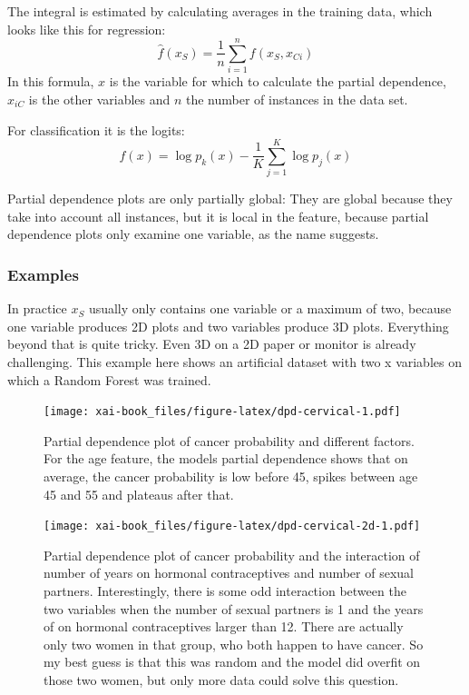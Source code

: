 \documentclass[12pt,]{krantz}
\theoremstyle{definition}
\theoremstyle{definition}
\theoremstyle{definition}
\theoremstyle{remark}
\begin{document}
The integral is estimated by calculating averages in the training data,
which looks like this for regression:
\[ \hat{f}(x_S) = \frac{1}{n} \sum_{i=1}^n f(x_S, x_{Ci}) \] In this
formula, \(x\) is the variable for which to calculate the partial
dependence, \(x_{iC}\) is the other variables and \(n\) the number of
instances in the data set.

For classification it is the logits:
\[ f(x) = \log p_k(x) - \frac{1}{K} \sum_{j=1}^K \log p_j(x) \]

Partial dependence plots are only partially global: They are global
because they take into account all instances, but it is local in the
feature, because partial dependence plots only examine one variable, as
the name suggests.

\subsubsection{Examples}\label{examples}

In practice \(x_S\) usually only contains one variable or a maximum of
two, because one variable produces 2D plots and two variables produce 3D
plots. Everything beyond that is quite tricky. Even 3D on a 2D paper or
monitor is already challenging. This example here shows an artificial
dataset with two x variables on which a Random Forest was trained.

\begin{figure}
\centering
\texttt{[image: xai-book\_files/figure-latex/dpd-cervical-1.pdf]}
\caption{\label{fig:dpd-cervical}Partial dependence plot of cancer
probability and different factors. For the age feature, the models
partial dependence shows that on average, the cancer probability is low
before 45, spikes between age 45 and 55 and plateaus after that.}
\end{figure}

\begin{figure}
\centering
\texttt{[image: xai-book\_files/figure-latex/dpd-cervical-2d-1.pdf]}
\caption{\label{fig:dpd-cervical-2d}Partial dependence plot of cancer
probability and the interaction of number of years on hormonal
contraceptives and number of sexual partners. Interestingly, there is
some odd interaction between the two variables when the number of sexual
partners is 1 and the years of on hormonal contraceptives larger than
12. There are actually only two women in that group, who both happen to
have cancer. So my best guess is that this was random and the model did
overfit on those two women, but only more data could solve this
question.}
\end{figure}
\end{document}
